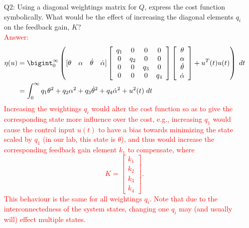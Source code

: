 \documentclass[12pt]{report}
\newcommand\drew[1]{\textcolor{red}{#1}}
\begin{document}
\begin{enumerate}
    \item[Q2:] Using a diagonal weightings matrix for $Q$, express the cost function symbolically. What would be the effect of increasing the diagonal elements $q_i$ on the feedback gain, $K$?\\
          \drew{Answer:
              \begin{align*}
                  \eta(u) & = \bigint_0^{\infty} \left( [\theta \quad \alpha \quad \dot{\theta} \quad \dot{\alpha}] \left[\begin{array}{c c c c}
                          q_1 & 0   & 0   & 0   \\
                          0   & q_2 & 0   & 0   \\
                          0   & 0   & q_3 & 0   \\
                          0   & 0   & 0   & q_4
                      \end{array}\right] \left[\begin{array}{c} \theta \\ \alpha \\ \dot{\theta} \\ \dot{\alpha} \end{array}\right] + u^T(t)u(t) \right)\; dt \\
                          & = \int_0^{\infty} q_1\theta^2 + q_2\alpha^2 + q_3\dot{\theta}^2 + q_4\dot{\alpha}^2 +u^2(t) \; dt
              \end{align*}
              Increasing the weightings $q_i$ would alter the cost function so as to give the corresponding state more influence over the cost, e.g., increasing $q_1$ would cause the control input $u(t)$ to have a bias towards minimizing the state scaled by $q_1$ (in our lab, this state is $\theta$), and thus would increase the corresponding feedback gain element $k_1$ to compensate, where
              \[
                  K = \left[\begin{array}{c} k_1 \\ k_2 \\ k_3 \\ k_4 \end{array}\right].
              \]
              This behaviour is the same for all weightings $q_i$. Note that due to the interconnectedness of the system states, changing one $q_i$ may (and usually will) effect multiple states.
          }

\end{enumerate}
\end{document}
